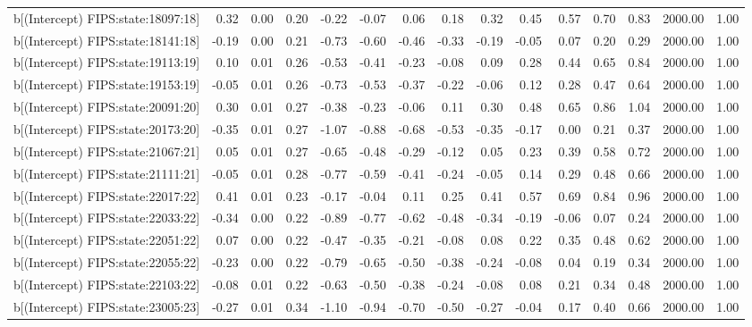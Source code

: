 \begin{table}[ht]
\begin{tabular}{rrrrrrrrrrrrrrr}
  b[(Intercept) FIPS:state:18097:18] & 0.32 & 0.00 & 0.20 & -0.22 & -0.07 & 0.06 & 0.18 & 0.32 & 0.45 & 0.57 & 0.70 & 0.83 & 2000.00 & 1.00 \\ 
  b[(Intercept) FIPS:state:18141:18] & -0.19 & 0.00 & 0.21 & -0.73 & -0.60 & -0.46 & -0.33 & -0.19 & -0.05 & 0.07 & 0.20 & 0.29 & 2000.00 & 1.00 \\ 
  b[(Intercept) FIPS:state:19113:19] & 0.10 & 0.01 & 0.26 & -0.53 & -0.41 & -0.23 & -0.08 & 0.09 & 0.28 & 0.44 & 0.65 & 0.84 & 2000.00 & 1.00 \\ 
  b[(Intercept) FIPS:state:19153:19] & -0.05 & 0.01 & 0.26 & -0.73 & -0.53 & -0.37 & -0.22 & -0.06 & 0.12 & 0.28 & 0.47 & 0.64 & 2000.00 & 1.00 \\ 
  b[(Intercept) FIPS:state:20091:20] & 0.30 & 0.01 & 0.27 & -0.38 & -0.23 & -0.06 & 0.11 & 0.30 & 0.48 & 0.65 & 0.86 & 1.04 & 2000.00 & 1.00 \\ 
  b[(Intercept) FIPS:state:20173:20] & -0.35 & 0.01 & 0.27 & -1.07 & -0.88 & -0.68 & -0.53 & -0.35 & -0.17 & 0.00 & 0.21 & 0.37 & 2000.00 & 1.00 \\ 
  b[(Intercept) FIPS:state:21067:21] & 0.05 & 0.01 & 0.27 & -0.65 & -0.48 & -0.29 & -0.12 & 0.05 & 0.23 & 0.39 & 0.58 & 0.72 & 2000.00 & 1.00 \\ 
  b[(Intercept) FIPS:state:21111:21] & -0.05 & 0.01 & 0.28 & -0.77 & -0.59 & -0.41 & -0.24 & -0.05 & 0.14 & 0.29 & 0.48 & 0.66 & 2000.00 & 1.00 \\ 
  b[(Intercept) FIPS:state:22017:22] & 0.41 & 0.01 & 0.23 & -0.17 & -0.04 & 0.11 & 0.25 & 0.41 & 0.57 & 0.69 & 0.84 & 0.96 & 2000.00 & 1.00 \\ 
  b[(Intercept) FIPS:state:22033:22] & -0.34 & 0.00 & 0.22 & -0.89 & -0.77 & -0.62 & -0.48 & -0.34 & -0.19 & -0.06 & 0.07 & 0.24 & 2000.00 & 1.00 \\ 
  b[(Intercept) FIPS:state:22051:22] & 0.07 & 0.00 & 0.22 & -0.47 & -0.35 & -0.21 & -0.08 & 0.08 & 0.22 & 0.35 & 0.48 & 0.62 & 2000.00 & 1.00 \\ 
  b[(Intercept) FIPS:state:22055:22] & -0.23 & 0.00 & 0.22 & -0.79 & -0.65 & -0.50 & -0.38 & -0.24 & -0.08 & 0.04 & 0.19 & 0.34 & 2000.00 & 1.00 \\ 
  b[(Intercept) FIPS:state:22103:22] & -0.08 & 0.01 & 0.22 & -0.63 & -0.50 & -0.38 & -0.24 & -0.08 & 0.08 & 0.21 & 0.34 & 0.48 & 2000.00 & 1.00 \\ 
  b[(Intercept) FIPS:state:23005:23] & -0.27 & 0.01 & 0.34 & -1.10 & -0.94 & -0.70 & -0.50 & -0.27 & -0.04 & 0.17 & 0.40 & 0.66 & 2000.00 & 1.00 \\ 

\end{tabular}
\end{table}
